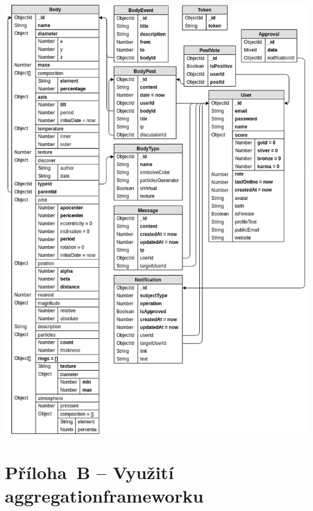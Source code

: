 \documentclass[a4paper,12pt]{article}
\begin{document}
\vspace{-0.5cm}\hspace{-1cm}
\includegraphics[width=470pt]{Images/DB.png}

\clearpage {}\label{prilohaB} 

\section*{Příloha~B --  Využití aggregation\newline frameworku}



\clearpage {}\label{prilohaC} 

\end{document}
